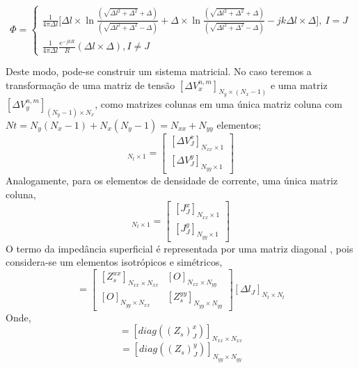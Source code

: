 \documentclass[
	12pt,				%
	openright,			%
	oneside,			%
	a4papey79r,			%
	english,			%
	brazil				%
	]{abntex2}
\begin{document}
\begin{equation}
   \Phi= \begin{cases}
        \frac{1}{4 \pi \Delta l} \biggl[\Delta l \times \ln{\frac{(\sqrt{{\Delta l}^2+\Delta^2}+\Delta)}{(\sqrt{{\Delta l}^2+\Delta^2}-\Delta)}} 
        + \Delta  \times \ln{\frac{(\sqrt{{\Delta l}^2+\Delta^2}+\Delta)}{(\sqrt{{\Delta l}^2+\Delta^2}-\Delta)}} -jk\Delta l \times \Delta
        \biggl], \ I=J \\
     \frac{1}{4 \pi \Delta l} \frac{e^{-jkR}}{R} ( \Delta l \times \Delta), I \neq J
    \end{cases}
\end{equation}

Deste modo,  pode-se construir um sistema matricial. No caso teremos a transformação de uma matriz de tensão $[\Delta V^{n,m}_x]_{N_y \times (N_x-1)}$ e uma matriz $[\Delta V^{n,m}_y]_{(N_y-1) \times N_x}$, como matrizes colunas em uma única matriz  coluna com $Nt=N_y(N_x-1)+N_x(N_y-1)=N_{xx}+N_{yy}$ elementos; 
\begin{equation}
    [\Delta V_J]_{N_t \times 1}= \begin{bmatrix}[\Delta V^{x}_J]_{N_{xx}\times 1} \\ [\Delta V^{y}_J]_{N_{yy}\times 1}\end{bmatrix}  
\end{equation}
Analogamente, para os elementos  de densidade de corrente, uma única matriz coluna,
\begin{equation}
    [J_I]_{N_t \times 1}= \begin{bmatrix} [J^{x}_J]_{N_{xx}\times 1} \\ [J^{y}_J]_{N_{yy}\times 1}\end{bmatrix}  
\end{equation}
O termo da impedância superficial é representada por uma matriz diagonal , pois considera-se um elementos isotrópicos e simétricos, 
\begin{equation}
   [Z_s]=\begin{bmatrix}[Z_s^{xx}]_{N_{xx}\times N_{xx}}& [O]_{N_{xx}\times N_{yy}}\\
   [O]_{N_{yy}\times N_{xx}}&[Z_s^{yy}]_{N_{yy}\times N_{yy}}
   \end{bmatrix}[\Delta l _J]_{N_t \times N_t}
\end{equation}
Onde,
\begin{equation}
    [Z_s^{xx}]=[diag (  (Z_s)_J^x)]_{N_{xx}\times N_{xx}}
\end{equation}
\begin{equation}
    [Z_s^{yy}]=[diag ((Z_s)_J^y)]_{N_{yy}\times N_{yy}}
\end{equation}
\end{document}

